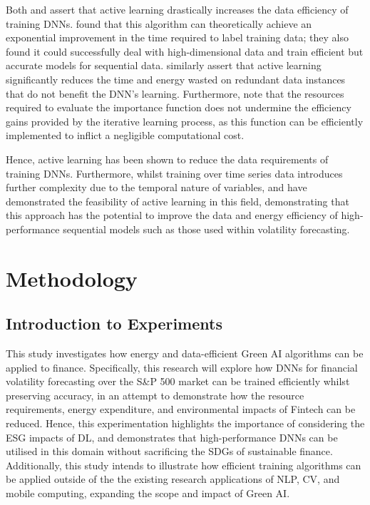 \documentclass[a4paper, 11pt]{report}
\begin{document}
    Both \citet{ren-2021} and \citet{xu-2021} assert that active learning drastically increases the data efficiency of training DNNs. \citet{ren-2021} found that this algorithm can theoretically achieve an exponential improvement in the time required to label training data; they also found it could successfully deal with high-dimensional data and train efficient but accurate models for sequential data. \citet{xu-2021} similarly assert that active learning significantly reduces the time and energy wasted on redundant data instances that do not benefit the DNN's learning. Furthermore, \citet{ren-2021} note that the resources required to evaluate the importance function does not undermine the efficiency gains provided by the iterative learning process, as this function can be efficiently implemented to inflict a negligible computational cost. 

    Hence, active learning has been shown to reduce the data requirements of training DNNs. Furthermore, whilst training over time series data introduces further complexity due to the temporal nature of variables, \citet{peng-2017} and \citet{zimmer-2018} have demonstrated the feasibility of active learning in this field, demonstrating that this approach has the potential to improve the data and energy efficiency of high-performance sequential models such as those used within volatility forecasting.


    \newpage
    \chapter{Methodology}
    \label{chapter: experiments}

    \section{Introduction to Experiments}

    This study investigates how energy and data-efficient Green AI algorithms can be applied to finance. Specifically, this research will explore how DNNs for financial volatility forecasting over the S\&P 500 market can be trained efficiently whilst preserving accuracy, in an attempt to demonstrate how the resource requirements, energy expenditure, and environmental impacts of Fintech can be reduced. Hence, this experimentation highlights the importance of considering the ESG impacts of DL, and demonstrates that high-performance DNNs can be utilised in this domain without sacrificing the SDGs of sustainable finance. Additionally, this study intends to illustrate how efficient training algorithms can be applied outside of the the existing research applications of NLP, CV, and mobile computing, expanding the scope and impact of Green AI.
\end{document}
